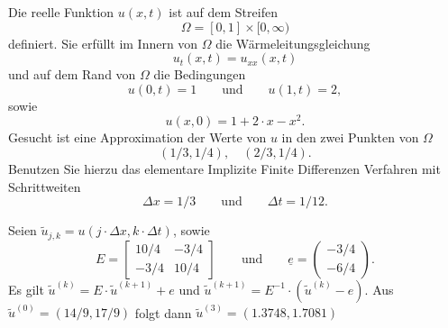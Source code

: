 Die reelle Funktion $u(x,t)$ ist auf dem Streifen
\[
\Omega = [0, 1] \times [0,\infty)
\]
definiert. Sie erfüllt im Innern von $\Omega$ die Wärmeleitungsgleichung
\[
u_{t}(x,t) = u_{xx}(x,t)
\]
und auf dem Rand von $\Omega$ die Bedingungen
\[
u(0,t) = 1 \qquad \text{und} \qquad  u(1,t) = 2,
\]
sowie
\[
u(x,0) = 1 + 2 \cdot x - x^2.
\]
Gesucht ist eine Approximation der Werte von $u$ in den zwei Punkten von $\Omega$
\[
(1/3, 1/4), \quad  (2/3, 1/4).
\]
Benutzen Sie hierzu das elementare Implizite Finite Differenzen Verfahren mit Schrittweiten
\[
\Delta x = 1/3 \qquad  \text{und} \qquad \Delta t = 1/12.
\]

\begin{loesung}
Seien $\tilde u_{j,k} = u(j \cdot \Delta x, k \cdot \Delta t)$, sowie
\[
E
=
\left[
\begin{array}{rr}
10/4 & - 3/4 \\
-3/4 & 10/4
\end{array}\right]
\qquad
\text{und}
\qquad
\underline{e}
=
\begin{pmatrix}
-3/4 \\ -6/4
\end{pmatrix}.
\]
Es gilt $\tilde u^{(k)} = E \cdot \tilde u^{(k+1)} + e$
und $\tilde u^{(k+1)} = E^{-1} \cdot (\tilde u^{(k)} - e).$
Aus $\tilde u^{(0)} = (14/9, 17/9)$ folgt dann
$\tilde u^{(3)} = (1.3748, 1.7081)$
\end{loesung}


